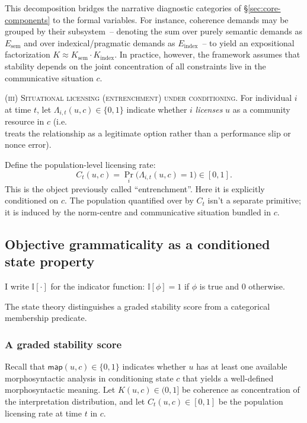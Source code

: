 \documentclass[12pt,letterpaper]{article}
\begin{document}
This decomposition bridges the narrative diagnostic categories of \S\ref{sec:core-components} to the formal variables. For instance, coherence demands may be grouped by their subsystem~-- denoting the sum over purely semantic demands as $E_{\text{sem}}$ and over indexical/pragmatic demands as $E_{\text{index}}$~-- to yield an expositional factorization $K \approx K_{\text{sem}} \cdot K_{\text{index}}$. In practice, however, the framework assumes that stability depends on the joint concentration of all constraints live in the communicative situation $c$.

\textsc{(iii) Situational licensing (entrenchment) under conditioning.}
For individual $i$ at time $t$, let $\Lambda_{i,t}(u,c)\in\{0,1\}$ indicate whether
$i$ \emph{licenses} $u$ as a community resource in $c$ (i.e.\\ treats the relationship as
a legitimate option rather than a performance slip or nonce error).

Define the population-level licensing rate:
\begin{equation*}
C_t(u,c)=\Pr_i\bigl(\Lambda_{i,t}(u,c)=1\bigr)\in[0,1].
\end{equation*}
This is the object previously called \enquote{entrenchment}.  Here it is explicitly
conditioned on $c$. The population quantified over by $C_t$ isn't a separate primitive; it is induced by the norm-centre and communicative situation bundled in $c$.

\subsection{Objective grammaticality as a conditioned state property}
\label{sec:objective-G}

I write $\mathbb{I}[\cdot]$ for the indicator function:
$\mathbb{I}[\phi]=1$ if $\phi$ is true and $0$ otherwise.

The state theory distinguishes a graded stability score from a categorical
membership predicate.

\subsubsection{A graded stability score}

Recall that $\mathsf{map}(u,c)\in\{0,1\}$ indicates whether $u$ has at least one
available morphosyntactic analysis in conditioning state $c$ that yields a
well-defined morphosyntactic meaning. Let $K(u,c)\in(0,1]$ be coherence as
concentration of the interpretation distribution, and let $C_t(u,c)\in[0,1]$ be
the population licensing rate at time $t$ in $c$.
\end{document}
